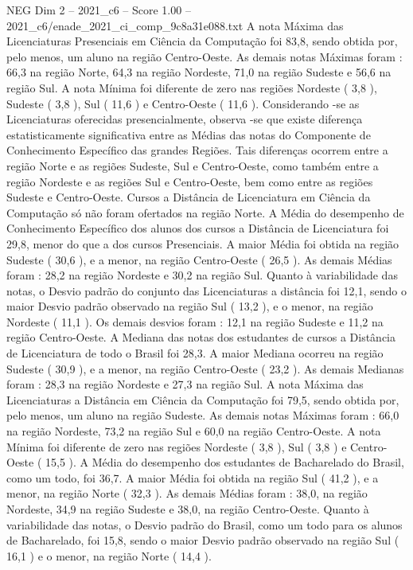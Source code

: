\begin{textsample}{NEG Dim 2 – 2021\_c6 – Score 1.00 – 2021\_c6/enade\_2021\_ci\_comp\_9c8a31e088.txt}
A nota Máxima das Licenciaturas Presenciais em Ciência da Computação foi 83,8, sendo obtida por, pelo menos, um aluno na região Centro-Oeste.
As demais notas Máximas foram : 66,3 na região Norte, 64,3 na região Nordeste, 71,0 na região Sudeste e 56,6 na região Sul.
A nota Mínima foi diferente de zero nas regiões Nordeste ( 3,8 ), Sudeste ( 3,8 ), Sul ( 11,6 ) e Centro-Oeste ( 11,6 ).
Considerando -se as Licenciaturas oferecidas presencialmente, observa -se que existe diferença estatisticamente significativa entre as Médias das notas do Componente de Conhecimento Específico das grandes Regiões.
Tais diferenças ocorrem entre a região Norte e as regiões Sudeste, Sul e Centro-Oeste, como também entre a região Nordeste e as regiões Sul e Centro-Oeste, bem como entre as regiões Sudeste e Centro-Oeste.
Cursos a Distância de Licenciatura em Ciência da Computação só não foram ofertados na região Norte.
A Média do desempenho de Conhecimento Específico dos alunos dos cursos a Distância de Licenciatura foi 29,8, menor do que a dos cursos Presenciais.
A maior Média foi obtida na região Sudeste ( 30,6 ), e a menor, na região Centro-Oeste ( 26,5 ).
As demais Médias foram : 28,2 na região Nordeste e 30,2 na região Sul.
Quanto à variabilidade das notas, o Desvio padrão do conjunto das Licenciaturas a distância foi 12,1, sendo o maior Desvio padrão observado na região Sul ( 13,2 ), e o menor, na região Nordeste ( 11,1 ).
Os demais desvios foram : 12,1 na região Sudeste e 11,2 na região Centro-Oeste.
A Mediana das notas dos estudantes de cursos a Distância de Licenciatura de todo o Brasil foi 28,3.
A maior Mediana ocorreu na região Sudeste ( 30,9 ), e a menor, na região Centro-Oeste ( 23,2 ).
As demais Medianas foram : 28,3 na região Nordeste e 27,3 na região Sul.
A nota Máxima das Licenciaturas a Distância em Ciência da Computação foi 79,5, sendo obtida por, pelo menos, um aluno na região Sudeste.
As demais notas Máximas foram : 66,0 na região Nordeste, 73,2 na região Sul e 60,0 na região Centro-Oeste.
A nota Mínima foi diferente de zero nas regiões Nordeste ( 3,8 ), Sul ( 3,8 ) e Centro-Oeste ( 15,5 ).
A Média do desempenho dos estudantes de Bacharelado do Brasil, como um todo, foi 36,7.
A maior Média foi obtida na região Sul ( 41,2 ), e a menor, na região Norte ( 32,3 ).
As demais Médias foram : 38,0, na região Nordeste, 34,9 na região Sudeste e 38,0, na região Centro-Oeste.
Quanto à variabilidade das notas, o Desvio padrão do Brasil, como um todo para os alunos de Bacharelado, foi 15,8, sendo o maior Desvio padrão observado na região Sul ( 16,1 ) e o menor, na região Norte ( 14,4 ).

\end{textsample}
